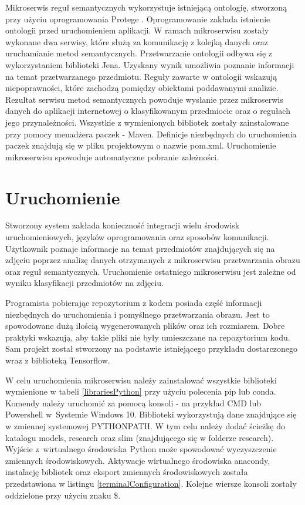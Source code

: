 Mikroserwis reguł semantycznych wykorzystuje istniejącą ontologię, stworzoną przy użyciu oprogramowania Protege \cite{Protege}. Oprogramowanie zakłada istnienie ontologii przed uruchomieniem aplikacji. W ramach mikroserwisu zostały wykonane dwa serwisy, które służą za komunikację z kolejką danych oraz uruchamianie metod semantycznych. Przetwarzanie ontologii odbywa się z wykorzystaniem biblioteki Jena. Uzyskany wynik umożliwia poznanie informacji na temat przetwarzanego przedmiotu. Reguły zawarte w ontologii wskazują niepoprawności, które zachodzą pomiędzy obiektami poddawanymi analizie. Rezultat serwisu metod semantycznych powoduje wysłanie przez mikroserwis danych do aplikacji internetowej o klasyfikowanym przedmiocie oraz o regułach jego przynależności. 
Wszystkie z wymienionych bibliotek zostały zainstalowane przy pomocy menadżera paczek - Maven. Definicje niezbędnych do uruchomienia paczek znajdują się w pliku projektowym o nazwie pom.xml. Uruchomienie mikroserwisu spowoduje automatyczne pobranie zależności.


\section{Uruchomienie}

Stworzony system zakłada konieczność integracji wielu środowisk uruchomieniowych, języków oprogramowania oraz sposobów komunikacji. Użytkownik poznaje informacje na temat przedmiotów znajdujących się na zdjęciu poprzez analizę danych otrzymanych z mikroserwisu przetwarzania obrazu oraz reguł semantycznych. Uruchomienie ostatniego mikroserwisu jest zależne od wyniku klasyfikacji przedmiotów na zdjęciu. 

Programista pobierając repozytorium z kodem posiada część informacji niezbędnych do uruchomienia i pomyślnego przetwarzania obrazu. Jest to spowodowane dużą ilością wygenerowanych plików oraz ich rozmiarem. Dobre praktyki wskazują, aby takie pliki nie były umieszczane na repozytorium kodu. Sam projekt został stworzony na podstawie istniejącego przykładu dostarczonego wraz z biblioteką Tensorflow. 

W celu uruchomienia mikroserwisu należy zainstalować wszystkie biblioteki wymienione w tabeli \ref{librariesPython} przy użyciu polecenia pip lub conda. Komendy należy uruchomić za pomocą konsoli - na przykład CMD lub Powershell\cite{Powershell} w~Systemie Windows 10. Biblioteki wykorzystują dane znajdujące się w zmiennej systemowej PYTHONPATH. W tym celu należy dodać ścieżkę do katalogu models, research oraz slim (znajdującego się w folderze research). Wyjście z~wirtualnego środowiska Python może spowodować wyczyszczenie zmiennych środowiskowych. Aktywacje wirtualnego środowiska anacondy, instalację bibliotek oraz eksport zmiennych środowiskowych została przedstawiona w listingu \ref{terminalConfiguration}. Kolejne wiersze konsoli zostały oddzielone przy użyciu znaku \$.


